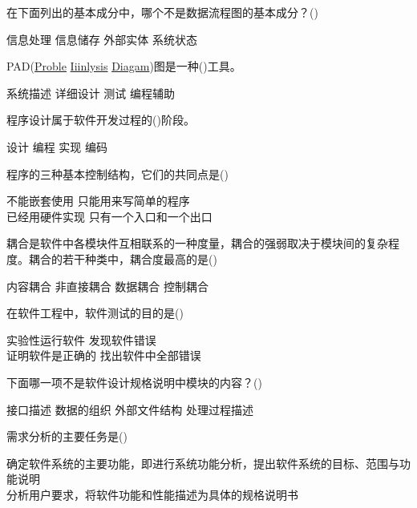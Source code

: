 \documentclass[answer]{exam}
\begin{document}
\begin{questions}
	\question 在下面列出的基本成分中，哪个不是数据流程图的基本成分？()\\
	\begin{oneparchoices}
		\choice 信息处理
		\choice 信息储存
		\choice 外部实体
		\choice 系统状态
	\end{oneparchoices}
	\question PAD(\uline{Proble} \uline{Iiinlysis} \uline{Diagam})图是一种()工具。\\
	\begin{oneparchoices}
		\choice 系统描述
		\choice 详细设计
		\choice 测试
		\choice 编程辅助
	\end{oneparchoices}
	\question 程序设计属于软件开发过程的()阶段。\\
	\begin{oneparchoices}
		\choice 设计
		\choice 编程
		\choice 实现
		\choice 编码
	\end{oneparchoices}
	\question 程序的三种基本控制结构，它们的共同点是()\\
	\begin{oneparchoices}
		\choice 不能嵌套使用
		\choice 只能用来写简单的程序\\
		\choice 已经用硬件实现
		\choice 只有一个入口和一个出口
	\end{oneparchoices}
	\question 耦合是软件中各模块件互相联系的一种度量，耦合的强弱取决于模块间的复杂程度。耦合的若干种类中，耦合度最高的是()\\
	\begin{oneparchoices}
		\choice 内容耦合
		\choice 非直接耦合
		\choice 数据耦合
		\choice 控制耦合
	\end{oneparchoices}
	\question 在软件工程中，软件测试的目的是()\\
	\begin{oneparchoices}
		\choice 实验性运行软件
		\choice 发现软件错误\\
		\choice 证明软件是正确的
		\choice 找出软件中全部错误
	\end{oneparchoices}
	\question 下面哪一项不是软件设计规格说明中模块的内容？()\\
	\begin{oneparchoices}
		\choice 接口描述
		\choice 数据的组织
		\choice 外部文件结构
		\choice 处理过程描述
	\end{oneparchoices}
	\question 需求分析的主要任务是()\\
	\begin{oneparchoices}
		\choice 确定软件系统的主要功能，即进行系统功能分析，提出软件系统的目标、范围与功能说明\\
		\choice 分析用户要求，将软件功能和性能描述为具体的规格说明书\\

\end{oneparchoices}
\end{questions}
\end{document}
